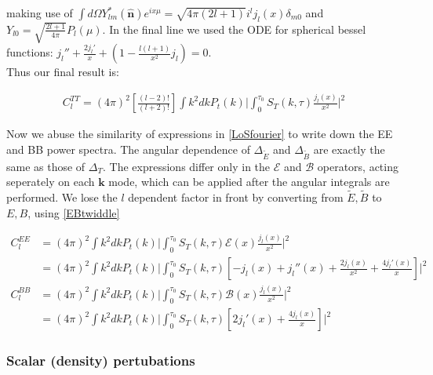 \documentclass[a4paper,10pt]{article}
\renewcommand{\v}[1]{\mathbf{#1}}
\newcommand{\unit}[1]{\hat{\v{#1}}}
\newcommand{\ltwof}{[\frac{(l-2)!}{(l+2)!}]}
\begin{document}
making use of $\int d\Omega Y_{lm}^*(\unit{n})e^{ix\mu} = \sqrt{4\pi(2l+1)}i^l j_l(x) \delta_{m0}$ and $Y_{l0} = \sqrt{\frac{2l+1}{4\pi}}P_l(\mu)$. In the final line we used the ODE for spherical bessel functions: $j_l''+\frac{2j_l'}{x}+(1-\frac{l(l+1)}{x^2}j_l)=0$.\\

Thus our final result is:

\begin{equation}\begin{split}
C_l^{TT} = (4\pi)^2\ltwof \int k^2 dk P_t(k) \bigg|  \int_0^{\tau_0} S_T(k,\tau)\frac{j_l(x)}{x^2} \bigg|^2
\end{split}\end{equation}

Now we abuse the similarity of expressions in \ref{LoSfourier} to write down the EE and BB power spectra. The angular dependence of $\Delta_{\tilde{E}}$ and $\Delta_{\tilde{B}}$ are exactly the same as those of $\Delta_T$. The expressions differ only in the $\mathcal{E}$ and $\mathcal{B}$ operators, acting seperately on each $\v{k}$ mode, which can be applied after the angular integrals are performed. We lose the $l$ dependent factor in front by converting from $\tilde{E}, \tilde{B}$ to $E,B$, using \ref{EBtwiddle}


\begin{equation}\begin{split}
C_l^{EE} &= (4\pi)^2 \int k^2 dk P_t(k) \bigg|  \int_0^{\tau_0} S_T(k,\tau)\mathcal{E}(x)\frac{j_l(x)}{x^2} \bigg|^2\\
&= (4\pi)^2\int k^2 dk P_t(k) \bigg|  \int_0^{\tau_0} S_T(k,\tau)[-j_l(x) +j_l''(x)+\frac{2j_l(x)}{x^2} + \frac{4j_l'(x)}{x}]\bigg|^2\\
C_l^{BB} &= (4\pi)^2 \int k^2 dk P_t(k) \bigg|  \int_0^{\tau_0} S_T(k,\tau)\mathcal{B}(x)\frac{j_l(x)}{x^2} \bigg|^2\\
&= (4\pi)^2\int k^2 dk P_t(k) \bigg|  \int_0^{\tau_0} S_T(k,\tau)[2j_l'(x)+\frac{4j_l(x)}{x}]\bigg|^2
\label{primordialBmodes}
\end{split}\end{equation}


\subsubsection{Scalar (density) pertubations}
\end{document}
